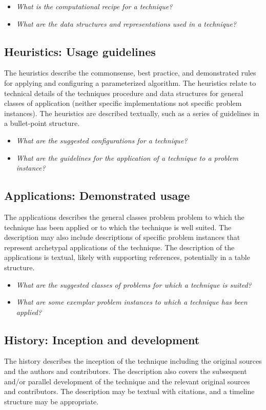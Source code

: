 \documentclass[a4paper, 11pt]{article}
\begin{document}
\begin{itemize}
	\item \emph{What is the computational recipe for a technique?}
	\item \emph{What are the data structures and representations used in a technique?}
\end{itemize}

\subsection{Heuristics: Usage guidelines}
The heuristics describe the commonsense, best practice, and demonstrated rules for applying and configuring a parameterized algorithm. The heuristics relate to technical details of the techniques procedure and data structures for general classes of application (neither specific implementations not specific problem instances). The heuristics are described textually, such as a series of guidelines in a bullet-point structure.

\begin{itemize}
	\item \emph{What are the suggested configurations for a technique?}
	\item \emph{What are the guidelines for the application of a technique to a problem instance?}
\end{itemize}

\subsection{Applications: Demonstrated usage}
The applications describes the general classes problem problem to which the technique has been applied or to which the technique is well suited. The description may also include descriptions of specific problem instances that represent archetypal applications of the technique. The description of the applications is textual, likely with supporting references, potentially in a table structure. 

\begin{itemize}
	\item \emph{What are the suggested classes of problems for which a technique is suited?}
	\item \emph{What are some exemplar problem instances to which a technique has been applied?}
\end{itemize}

\subsection{History: Inception and development}
The history describes the inception of the technique including the original sources and the authors and contributors. The description also covers the subsequent and/or parallel development of the technique and the relevant original sources and contributors. The description may be textual with citations, and a timeline structure may be appropriate.
\end{document}
